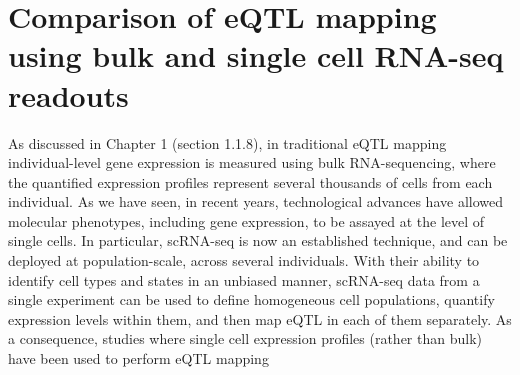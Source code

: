 
\chapter{Comparison of eQTL mapping using bulk and single cell RNA-seq readouts}
\label{chapter3}

As discussed in Chapter 1 (section 
1.1.8), 
in traditional 
eQTL
mapping 
individual-level 
gene expression 
is
measured using bulk RNA-sequencing, where 
the quantified 
expression profiles represent
several thousands of cells from each individual.
As we have seen, in recent years, technological advances 
have allowed molecular phenotypes, including gene expression, to be assayed at the level of single cells.
In particular, 
scRNA-seq
is now an established technique, 
and can be deployed at population-scale, across several individuals.
With their ability to identify cell types and states in an unbiased manner,
scRNA-seq
data from a single experiment can be used to define homogeneous cell populations, quantify expression levels within them, and then map eQTL in each of them separately.
As a consequence, studies where single cell expression profiles (rather than bulk) have been used to perform
eQTL
mapping 
